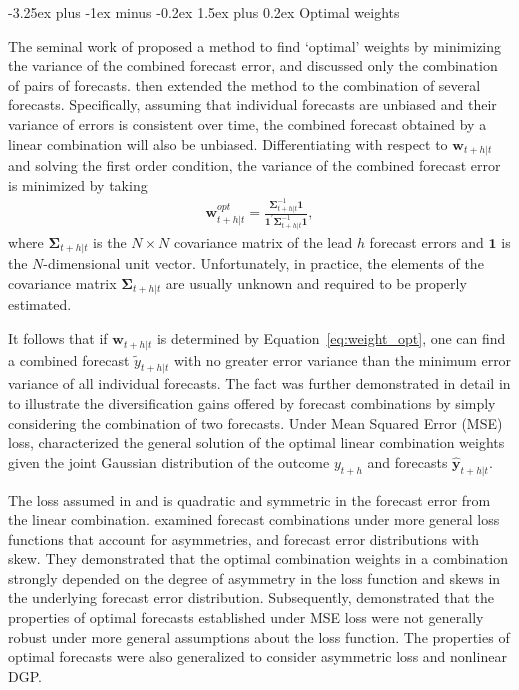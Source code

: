\documentclass[11pt]{article}
\makeatletter
\renewcommand{\paragraph}{\@startsection{paragraph}{4}{0ex}%
   {-3.25ex plus -1ex minus -0.2ex}%
   {1.5ex plus 0.2ex}%
   {\normalfont\normalsize\bfseries}}
\makeatother
\begin{document}
\paragraph{Optimal weights}

The seminal work of \cite{Bates1969-yj} proposed a method to find `optimal' weights by minimizing the variance of the combined forecast error, and discussed only the combination of pairs of forecasts. \cite{Newbold1974-lp} then extended the method to the combination of several forecasts. Specifically, assuming that individual forecasts are unbiased and their variance of errors is consistent over time, the combined forecast obtained by a linear combination will also be unbiased. Differentiating with respect to $\boldsymbol{w}_{t+h|t}$ and solving the first order condition, the variance of the combined forecast error is minimized by taking
\begin{align}
\label{eq:weight_opt}
\boldsymbol{w}_{t+h|t}^{opt}=\frac{\boldsymbol{\Sigma}_{t+h|t}^{-1}\mathbf{1}}{\mathbf{1}^{\prime} \boldsymbol{\Sigma}_{t+h|t}^{-1} \mathbf{1}},
\end{align}
where $\boldsymbol{\Sigma}_{t+h|t}$ is the $N \times N$ covariance matrix of the lead $h$ forecast errors and $\mathbf{1}$ is the $N$-dimensional unit vector. Unfortunately, in practice, the elements of the covariance matrix $\boldsymbol{\Sigma}_{t+h|t}$ are usually unknown and required to be properly estimated.

It follows that if $\boldsymbol{w}_{t+h|t}$ is determined by Equation~\eqref{eq:weight_opt}, one can find a combined forecast $\tilde{y}_{t+h|t}$ with no greater error variance than the minimum error variance of all individual forecasts. The fact was further demonstrated in detail in \cite{Timmermann2006-en} to illustrate the diversification gains offered by forecast combinations by simply considering the combination of two forecasts. Under Mean Squared Error (MSE) loss, \cite{Timmermann2006-en} characterized the general solution of the optimal linear combination weights given the joint Gaussian distribution of the outcome $y_{t+h}$ and forecasts $\hat{\mathbf{y}}_{t+h|t}$.

The loss assumed in \cite{Bates1969-yj} and \cite{Newbold1974-lp} is quadratic and symmetric in the forecast error from the linear combination. \cite{Elliott2004-dz} examined forecast combinations under more general loss functions that account for asymmetries, and forecast error distributions with skew. They demonstrated that the optimal combination weights in a combination strongly depended on the degree of asymmetry in the loss function and skews in the underlying forecast error distribution. Subsequently, \cite{Patton2007-zo} demonstrated that the properties of optimal forecasts established under MSE loss were not generally robust under more general assumptions about the loss function. The properties of optimal forecasts were also generalized to consider asymmetric loss and nonlinear DGP.
\end{document}
